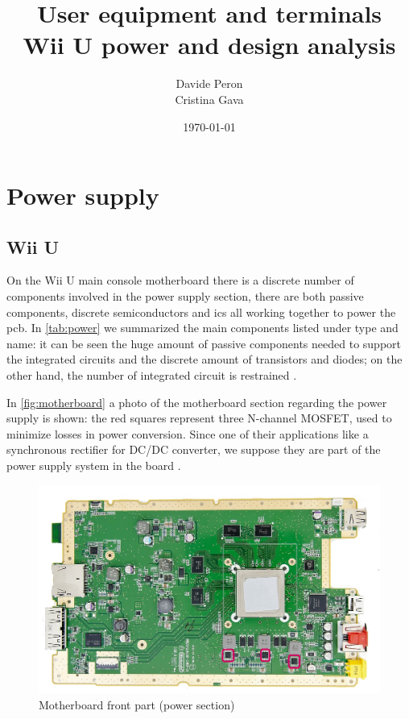 \documentclass[11pt,a4paper,titlepage]{article}
\title{\blue User equipment and terminals \\
\blueb Wii U power and design analysis}
\author{Davide Peron\\ Cristina Gava}
\date{\today}
\begin{document}
\maketitle

\tableofcontents
\clearpage

\section{Power supply}
  \subsection{Wii U}
		  On the Wii U main console motherboard there is a discrete number of components involved in the power supply section, there are both passive components, discrete semiconductors and \glspl{ic} all working together to power the \gls{pcb}. In \autoref{tab:power} we summarized the main components listed under type and name: it can be seen the huge amount of passive components needed to support the integrated circuits and the discrete amount of transistors and		  diodes; on the other hand, the number of integrated circuit is restrained \cite{componentslist}.

		  In \autoref{fig:motherboard} a photo of the motherboard section regarding the power supply is shown: the red squares represent three N-channel MOSFET, used to minimize losses in power conversion. Since one of their applications like a synchronous rectifier for DC/DC converter, we suppose they are part of the power supply system in the board \cite{mosfet8026}.

		  \begin{figure}
				\centering
				\includegraphics[width = .85\textwidth]{motherboard_front.png}
				\caption{Motherboard front part (power section)}
				\label{fig:motherboard}
		  \end{figure}
\end{document}
